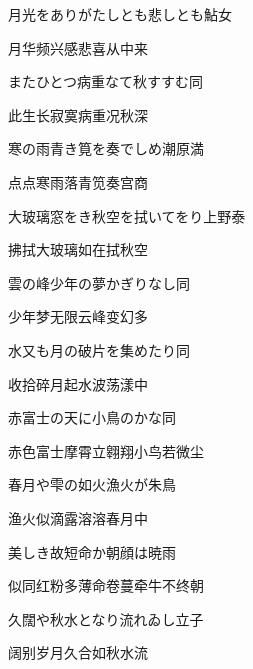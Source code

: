 \begin{haiku}
    {\FH 月光をありがたしとも悲しとも}\hfill{\FH 鮎女}

    {\FK 月华频兴感悲喜从中来}
\end{haiku}

\begin{haiku}
    {\FH またひとつ病重なて秋すすむ}\hfill{\FH 同}

    {\FK 此生长寂寞病重况秋深}
\end{haiku}

\begin{haiku}
    {\FH 寒の雨青き筧を奏でしめ}\hfill{\FH 潮原満}

    {\FK 点点寒雨落青笕奏宫商}
\end{haiku}

\begin{haiku}
    {\FH 大玻璃窓をき秋空を拭いてをり}\hfill{\FH 上野泰}

    {\FK 拂拭大玻璃如在拭秋空}
\end{haiku}

\begin{haiku}
    {\FH 雲の峰少年の夢かぎりなし}\hfill{\FH 同}

    {\FK 少年梦无限云峰变幻多}
\end{haiku}

\begin{haiku}
    {\FH 水又も月の破片を集めたり}\hfill{\FH 同}

    {\FK 收拾碎月起水波荡漾中}
\end{haiku}

\begin{haiku}
    {\FH 赤富士の天に小鳥のかな}\hfill{\FH 同}

    {\FK 赤色富士摩霄立翱翔小鸟若微尘}
\end{haiku}

\begin{haiku}
    {\FH 春月や雫の如火漁火が}\hfill{\FH 朱鳥}

    {\FK 渔火似滴露溶溶春月中}
\end{haiku}

\begin{haiku}
    {\FH 美しき故短命か朝顔は}\hfill{\FH 暁雨}

    {\FK 似同红粉多薄命卷蔓牵牛不终朝}
\end{haiku}

\begin{haiku}
    {\FH 久闊や秋水となり流れゐし}\hfill{\FH 立子}

    {\FK 阔别岁月久合如秋水流}
\end{haiku}

